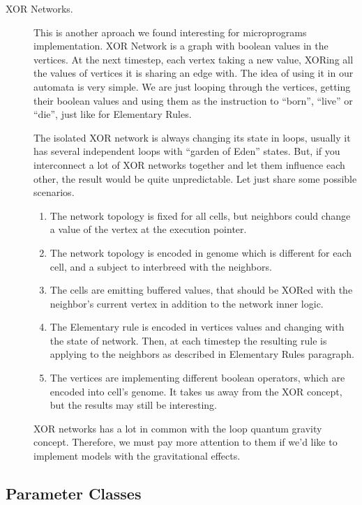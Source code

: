 \documentclass[a4paper,12pt,tikz,UTF8]{article}
\begin{document}
\begin{description}
      \item [XOR Networks.] This is another aproach we found interesting for microprograms implementation. XOR Network is a graph with boolean values in the vertices. At the next timestep, each vertex taking a new value, XORing all the values of vertices it is sharing an edge with. The idea of using it in our automata is very simple. We are just looping through the vertices, getting their boolean values and using them as the instruction to ``born'', ``live'' or ``die'', just like for Elementary Rules.

        The isolated XOR network is always changing its state in loops, usually it has several independent loops with ``garden of Eden'' states. But, if you interconnect a lot of XOR networks together and let them influence each other, the result would be quite unpredictable. Let just share some possible scenarios.
        \begin{enumerate}
          \item The network topology is fixed for all cells, but neighbors could change a value of the vertex at the execution pointer. 
          \item The network topology is encoded in genome which is different for each cell, and a subject to interbreed with the neighbors.
          \item The cells are emitting buffered values, that should be XORed with the neighbor's current vertex in addition to the network inner logic.
          \item The Elementary rule is encoded in vertices values and changing with the state of network. Then, at each timestep the resulting rule is applying to the neighbors as described in Elementary Rules paragraph.
          \item The vertices are implementing different boolean operators, which are encoded into cell's genome. It takes us away from the XOR concept, but the results may still be interesting.
        \end{enumerate}

        XOR networks has a lot in common with the loop quantum gravity concept. Therefore, we must pay more attention to them if we'd like to implement models with the gravitational effects.

    \end{description}

  \subsection{Parameter Classes}
\end{document}
